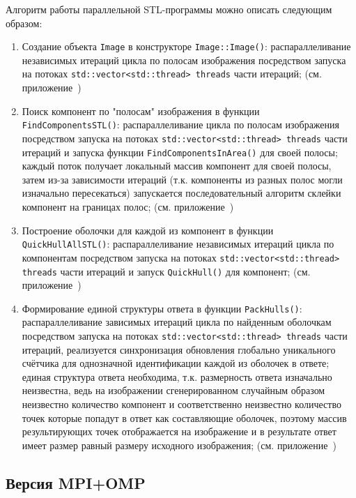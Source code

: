 \documentclass[12pt]{article}
\begin{document}
Алгоритм работы параллельной STL-программы можно описать следующим образом:

\begin{enumerate}
    \item Создание объекта \texttt{Image} в конструкторе \texttt{Image::Image()}: распараллеливание независимых итераций цикла по полосам изображения посредством запуска на потоках \texttt{std::vector<std::thread> threads} части итераций; (см. приложение~)
    \item Поиск компонент по "полосам" изображения в функции \texttt{FindComponentsSTL()}: распараллеливание цикла по полосам изображения посредством запуска на потоках \texttt{std::vector<std::thread> threads} части итераций и запуска функции \texttt{FindComponentsInArea()} для своей полосы; каждый поток получает локальный массив компонент для своей полосы, затем из-за зависимости итераций (т.к. компоненты из разных полос могли изначально пересекаться) запускается последовательный алгоритм склейки компонент на границах полос; (см. приложение~)
    \item Построение оболочки для каждой из компонент в функции \texttt{QuickHullAllSTL()}: распараллеливание независимых итераций цикла по компонентам посредством запуска на потоках \texttt{std::vector<std::thread> threads} части итераций и запуск \texttt{QuickHull()} для компонент; (см. приложение~)
    \item Формирование единой структуры ответа в функции \texttt{PackHulls()}: распараллеливание зависимых итераций цикла по найденным оболочкам посредством запуска на потоках \texttt{std::vector<std::thread> threads} части итераций, реализуется синхронизация обновления глобально уникального счётчика для однозначной идентификации каждой из оболочек в ответе; единая структура ответа необходима, т.к. размерность ответа изначально неизвестна, ведь на изображении сгенерированном случайным образом неизвестно количество компонент и соответственно неизвестно количество точек которые попадут в ответ как составляющие оболочек, поэтому массив результирующих точек отображается на изображение и в результате ответ имеет размер равный размеру исходного изображения; (см. приложение~)
\end{enumerate}

\newpage

\subsection{Версия MPI+OMP}
\end{document}
